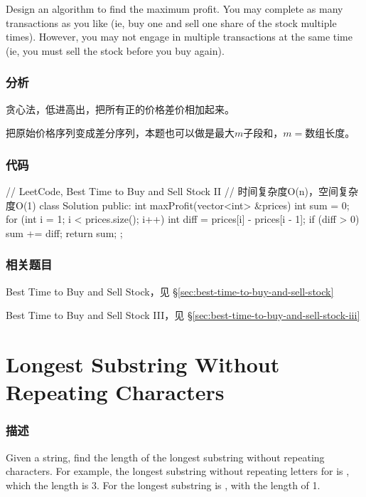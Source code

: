 Design an algorithm to find the maximum profit. You may complete as many transactions as you like (ie, buy one and sell one share of the stock multiple times). However, you may 
not engage in multiple transactions at the same time (ie, you must sell the stock before you buy again).


\subsubsection{分析}
贪心法，低进高出，把所有正的价格差价相加起来。

把原始价格序列变成差分序列，本题也可以做是最大$m$子段和，$m=$数组长度。

\subsubsection{代码}
\begin{Code}
	// LeetCode, Best Time to Buy and Sell Stock II
	// 时间复杂度O(n)，空间复杂度O(1)
	class Solution {
		public:
		int maxProfit(vector<int> &prices) {
			int sum = 0;
			for (int i = 1; i < prices.size(); i++) {
				int diff = prices[i] - prices[i - 1];
				if (diff > 0) sum += diff;
			}
			return sum;
		}
	};
\end{Code}


\subsubsection{相关题目}
\begindot
\item Best Time to Buy and Sell Stock，见 \S \ref{sec:best-time-to-buy-and-sell-stock}
\item Best Time to Buy and Sell Stock III，见 \S \ref{sec:best-time-to-buy-and-sell-stock-iii}
\myenddot


\section{Longest Substring Without Repeating Characters} %
\label{sec:longest-substring-without-repeating-characters}


\subsubsection{描述}
Given a string, find the length of the longest substring without repeating characters. For example, the longest substring without repeating letters for  is 
, which the length is 3. For  the longest substring is , with the length of 1.


